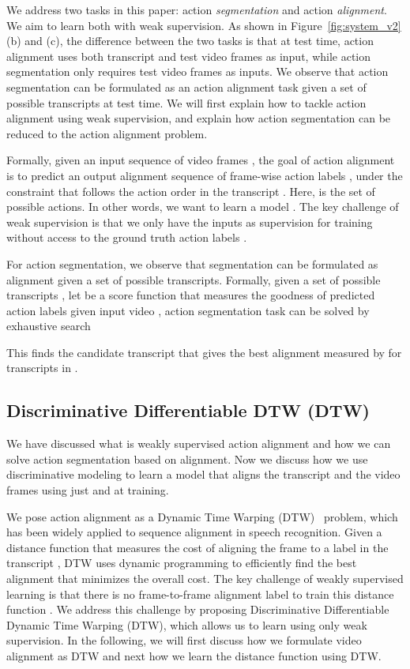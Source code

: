 \documentclass[10pt,twocolumn,letterpaper]{article}
\newcommand{\dttw}{DTW\xspace}
\begin{document}
We address two tasks in this paper: action \emph{segmentation} and action \emph{alignment}. We aim to learn both with weak supervision. As shown in Figure~\ref{fig:system_v2}(b) and (c), the difference between the two tasks is that at test time, action alignment uses both transcript and test video frames as input, while action segmentation only requires  test video frames as inputs. We observe that action segmentation can be formulated as an action alignment task given a set of possible transcripts at test time. We will first explain how to tackle action alignment using weak supervision, and explain how action segmentation can be reduced to the action alignment problem.


Formally, given an input sequence of video frames , the goal of action alignment is to predict an output alignment sequence of frame-wise action labels , under the constraint that  follows the action order in the transcript  . Here,  is the set of possible actions. In other words, we want to learn a model . The key challenge of weak supervision is that we only have the inputs  as supervision for training  without access to the ground truth action labels .

For action segmentation, we observe that segmentation can be formulated as alignment given a set of possible transcripts. Formally, given a set of possible transcripts , let  be a score function that measures the goodness of predicted action labels  given input video , action segmentation task can be solved by exhaustive search

This finds the candidate transcript  that gives the best alignment measured by  for transcripts in .



\subsection{Discriminative Differentiable DTW (\dttw)}

We have discussed what is weakly supervised action alignment and how we can solve action segmentation based on alignment. Now we discuss how we use discriminative modeling to learn a model that aligns the transcript  and the video frames  using just  and  at training.

We pose action alignment as a Dynamic Time Warping  (DTW)~\cite{sakoe1978dynamic} problem, which has been widely applied to sequence alignment in speech recognition. Given a distance function  that measures the cost of aligning the frame  to a label in the transcript , DTW uses dynamic programming to efficiently find the best alignment that minimizes the overall cost. The key challenge of weakly supervised learning is that there is no frame-to-frame alignment label to train this distance function . We address this challenge by proposing Discriminative Differentiable Dynamic Time Warping (\dttw), which allows us to learn  using only weak supervision. In the following, we will first discuss how we formulate video alignment as DTW and next how we learn the distance function  using \dttw. 
\end{document}
